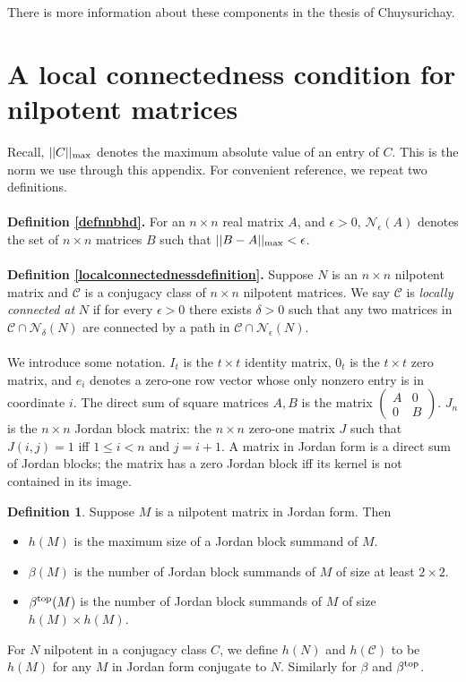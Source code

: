 \documentclass{amsart}
\theoremstyle{definition}
\newtheorem{definition}[theorem]{Definition}
\theoremstyle{remark}
\numberwithin{equation}{section}
\begin{document}
{{There is more information about these components in 
the thesis \cite{Ch} of Chuysurichay.

\section{A local connectedness condition for nilpotent matrices}
\label{connectionappendix} 

Recall,  $||C||_{\textnormal{max}}$ denotes the maximum absolute value of an 
entry of $C$. This is the norm we use through this appendix. 
For convenient reference, we repeat two definitions. 
\\ \\ 
{\bf Definition \ref{defnnbhd}.}
 For an $n\times n$ real matrix $A$,  and $\epsilon >0$,  
$\mathcal N_{\epsilon}(A)$ denotes the set of $n\times n$ 
matrices $B$ such that  $||B-A||_{\textnormal{max}}< \epsilon $. 
\\ \\ 
{\bf Definition \ref{localconnectednessdefinition}.} 
Suppose $N$ is an $n\times n$ nilpotent matrix and 
$\mathcal C$ is a 
 conjugacy class of  $n\times n$ 
nilpotent matrices. We say $\mathcal C$ is 
{\it locally connected at} $N$ if  for every $\epsilon >0$ 
there exists 
$\delta >0$ such that any two matrices in 
$\mathcal C \cap \mathcal N_{\delta}(N)$ are connected 
by a path in $\mathcal C \cap\mathcal N_{\epsilon}(N)$.
\\ \\ 
We introduce 
some  notation. 
$I_t$ is the $t\times t$ identity matrix, 
$0_t$ is the $t\times t$ zero matrix, 
and  
$e_i$ denotes a zero-one row vector whose 
only nonzero entry is in coordinate $i$. 
The direct sum of square matrices $A,B$ is 
the matrix 
$
\left(
\begin{smallmatrix} A & 0 \\ 0 & B 
\end{smallmatrix}
\right)
$. 
$J_n$ is the $n\times n$ 
Jordan block matrix: 
the $n\times n$ zero-one matrix $J$ 
 such that $J(i,j) =1$ iff 
$1\leq i < n$ and $j=i+1$. 
A matrix in Jordan form is a direct sum of Jordan blocks; 
the matrix  
has a zero 
Jordan block iff its kernel is not contained in its image. 

\begin{definition}\label{betasnotation} 
Suppose  $M$ is a  nilpotent matrix in Jordan form. 
Then 
\begin{itemize} 
\item 
$h(M)$ is the maximum size of a Jordan block summand of $M$.  
\item 
$\beta(M)$ is the number of Jordan block summands of $M$ of size 
at least $2\times 2$. 
\item 
$\beta^{\textnormal{top}}(M)$ is the number of Jordan block summands of $M$ 
of size $h(M)\times h(M)$. 
\end{itemize} 
For $N$ nilpotent in a conjugacy class $C$, we define 
$h(N)$ and $h({\mathcal C})$ to be $h(M)$ for any $M$ in Jordan 
form conjugate to $N$. Similarly for $\beta$ and 
$\beta^{\textnormal{top}}$. 
\end{definition} 

}}
\end{document}
